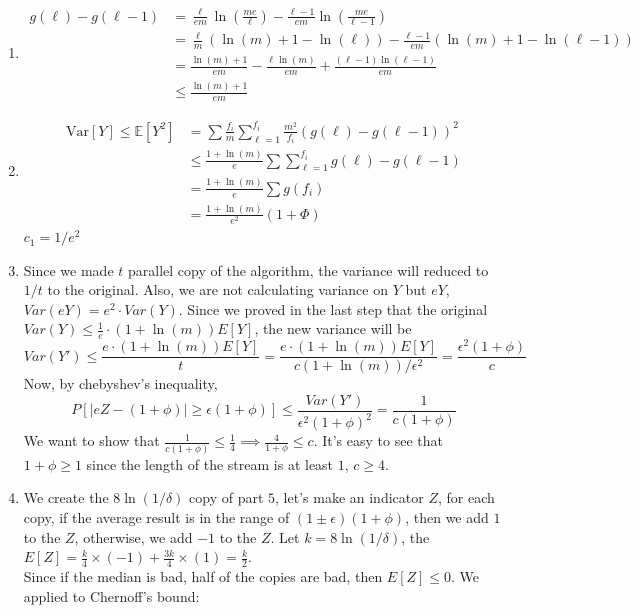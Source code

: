 \documentclass[11pt]{article}%
\begin{document}
\begin{questions}[1]
\begin{enumerate}
    \item 
    \begin{align*}
        g(\ell) - g(\ell - 1) &= \frac{\ell}{em}\ln(\frac{me}{\ell}) - \frac{\ell - 1}{em}\ln(\frac{me}{\ell - 1}) \\
        &= \frac{\ell}{m}(\ln(m) + 1 -\ln(\ell)) - \frac{\ell - 1}{em}(\ln(m) + 1 - \ln(\ell - 1)) \\
        &= \frac{\ln(m) + 1}{em} - \frac{\ell \ln(m)}{em} + \frac{(\ell - 1)\ln(\ell -1)}{em} \\
        &\leq \frac{\ln(m) + 1}{em}
    \end{align*}
    \item
    \begin{align*}
        \mathrm{Var}[Y] \leq \mathbb{E}[Y^2] &= \sum \frac{f_i}{m} \sum_{\ell = 1}^{f_i}\frac{m^2}{f_i}(g(\ell) - g(\ell - 1))^2 \\
        &\leq \frac{1 + \ln(m)}{e} \sum \sum_{\ell = 1}^{f_i}g(\ell) - g(\ell - 1) \\
        &= \frac{1 + \ln(m)}{e} \sum g(f_i) \\
        &= \frac{1 + \ln(m)}{e^2} (1 + \Phi)
    \end{align*}
    $c_1 = 1/e^2$
    \item Since we made $t$ parallel copy of the algorithm, the variance will reduced to $1/t$ to the original. Also, we are not calculating variance on $Y$ but $eY$, $Var(eY) = e^2\cdot Var(Y)$. Since we proved in the last step that the original $Var(Y)\leq \frac{1}{e}\cdot (1+ \ln(m))E[Y]$, the new variance will be 
    $$Var(Y') \leq \frac{e\cdot (1+ \ln(m))E[Y]}{t} = \frac{e\cdot (1+ \ln(m))E[Y]}{c(1+ \ln(m))/\epsilon^2} = \frac{\epsilon^2(1+\phi)}{c}$$
    Now, by chebyshev's inequality,
    $$ P[|eZ - (1+\phi)|\geq \epsilon(1+\phi)] \leq \frac{Var(Y')}{\epsilon^2(1+\phi)^2} = \frac{1}{c(1+\phi)}$$
    We want to show that $\frac{1}{c(1+\phi)} \leq \frac{1}{4} \implies \frac{4}{1+\phi}\leq c$. It's easy to see that $1+\phi \geq 1$ since the length of the stream is at least $1$, $c \geq 4$.
    \item We create the $8\ln(1/\delta)$ copy of part $5$, let's make an indicator $Z$, for each copy, if the average result is in the range of $(1\pm \epsilon)(1 + \phi)$, then we add $1$ to the $Z$, otherwise, we add $-1$ to the $Z$. Let $k = 8\ln(1/\delta)$, the $E[Z] = \frac{k}{4}\times(-1) + \frac{3k}{4}\times(1) = \frac{k}{2}$.\\
    Since if the median is bad, half of the copies are bad, then $E[Z] \leq 0$. We applied to Chernoff's bound:\\

\end{enumerate}
\end{questions}
\end{document}
